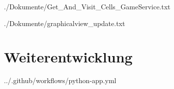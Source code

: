 \begin{minipage}{\textwidth}
	
	{./Dokumente/Get_And_Visit_Cells_GameService.txt}
\end{minipage}

\begin{minipage}{\textwidth}
	
	{./Dokumente/graphicalview_update.txt}
\end{minipage}

\section{Weiterentwicklung}
\label{sec:anhang-weiterentwicklung}

\begin{minipage}{\textwidth}
	
	{../.github/workflows/python-app.yml}
\end{minipage}
